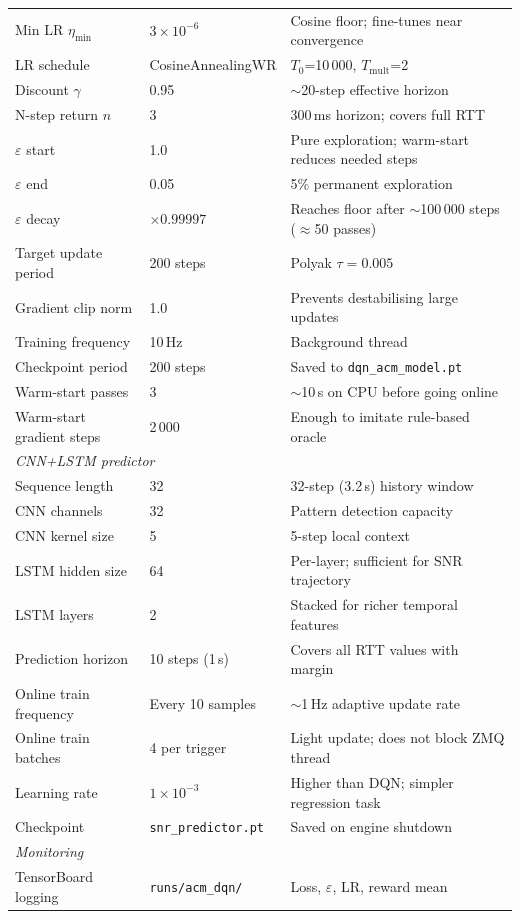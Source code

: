 \documentclass[12pt,a4paper]{report}
\begin{document}
\begin{table}[H]
\begin{tabular}{lll}
Min LR $\eta_\text{min}$ & $3\times10^{-6}$ & Cosine floor; fine-tunes near convergence \\
LR schedule             & CosineAnnealingWR & $T_0$=10\,000, $T_\text{mult}$=2 \\
Discount $\gamma$       & 0.95            & $\sim$20-step effective horizon \\
N-step return $n$       & 3               & 300\,ms horizon; covers full RTT \\
$\varepsilon$ start     & 1.0             & Pure exploration; warm-start reduces needed steps \\
$\varepsilon$ end       & 0.05            & 5\% permanent exploration \\
$\varepsilon$ decay     & $\times0.99997$ & Reaches floor after $\sim$100\,000 steps ($\approx$50 passes) \\
Target update period    & 200 steps       & Polyak $\tau = 0.005$ \\
Gradient clip norm      & 1.0             & Prevents destabilising large updates \\
Training frequency      & 10\,Hz          & Background thread \\
Checkpoint period       & 200 steps       & Saved to \texttt{dqn\_acm\_model.pt} \\
Warm-start passes       & 3               & $\sim$10\,s on CPU before going online \\
Warm-start gradient steps & 2\,000        & Enough to imitate rule-based oracle \\
\midrule
\multicolumn{3}{l}{\textit{CNN+LSTM predictor}} \\
Sequence length         & 32              & 32-step (3.2\,s) history window \\
CNN channels            & 32              & Pattern detection capacity \\
CNN kernel size         & 5               & 5-step local context \\
LSTM hidden size        & 64              & Per-layer; sufficient for SNR trajectory \\
LSTM layers             & 2               & Stacked for richer temporal features \\
Prediction horizon      & 10 steps (1\,s) & Covers all RTT values with margin \\
Online train frequency  & Every 10 samples & $\sim$1\,Hz adaptive update rate \\
Online train batches    & 4 per trigger   & Light update; does not block ZMQ thread \\
Learning rate           & $1\times10^{-3}$ & Higher than DQN; simpler regression task \\
Checkpoint              & \texttt{snr\_predictor.pt} & Saved on engine shutdown \\
\midrule
\multicolumn{3}{l}{\textit{Monitoring}} \\
TensorBoard logging     & \texttt{runs/acm\_dqn/} & Loss, $\varepsilon$, LR, reward mean \\
\bottomrule
\end{tabular}
\end{table}
\end{document}
